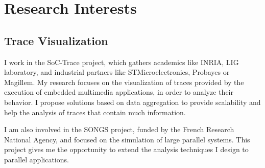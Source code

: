 \section{Research Interests}

\subsection{Trace Visualization}

%
{I work in the SoC-Trace project, which gathers academics like INRIA, LIG 
laboratory, and industrial partners like STMicroelectronics, Probayes or 
Magillem. My research focuses on the visualization of traces provided by 
the execution of embedded multimedia applications, in order to analyze their 
behavior. I propose solutions based on data aggregation to provide scalability 
and help the analysis of traces that contain much information.}

%
{I am also involved in the SONGS project, funded by the French 
Research National Agency, and focused on the simulation of large parallel 
systems. This project gives me the opportunity to extend the analysis 
techniques I design to parallel applications.}